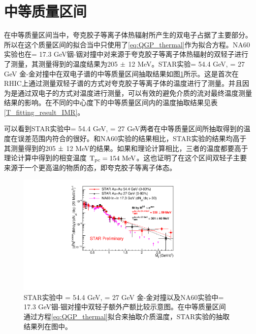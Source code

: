 \section{中等质量区间}

在中等质量区间当中，夸克胶子等离子体热辐射所产生的双电子占据了主要部分。所以在这个质量区间的拟合当中只使用了\ref{eq:QGP_thermal}作为拟合方程。NA60实验也在\sNN = 17.3 GeV铟-铟对撞中对来源于夸克胶子等离子体热辐射的双轻子进行了测量，其测量得到的温度结果为205 $\rm{ \pm }$ 12 MeV\cite{Specht:2010xu}。STAR实验\sNN = 54.4 GeV, \sNN = 27 GeV 金-金对撞中在双电子谱的中等质量区间抽取结果如图\ref{fig:Hm_ExY_FMR_54GeV_27GeV_NA60_QGPfit_icent0}所示。这是首次在RHIC上通过测量双轻子谱的方式对夸克胶子等离子体的温度进行了测量。并且因为是通过双电子的方式对温度进行测量，可以有效的避免介质的流对最终温度测量结果的影响。在不同的中心度下的中等质量区间内的温度抽取结果见表\ref{T_fitting_result_IMR}。

可以看到STAR实验中\sNN = 54.4 GeV, \sNN = 27 GeV两者在中等质量区间所抽取得到的温度在误差范围内符合的很好。和NA60实验的结果相比，STAR实验的结果均高于其测量得到的205 $\rm{ \pm }$ 12 MeV的结果。如果和理论计算相比，三者的温度都要高于理论计算中得到的相变温度 $\rm{T_{pc} =154~ MeV}$\cite{HotQCD:2018pds}。这也证明了在这个区间双轻子主要来源于一个更高温的物质的态，即夸克胶子等离子体态。

\begin{figure}[htb]
    \begin{center}
    \includegraphics[width=0.75\textwidth,clip]{figures/Chapter4/Hm_ExY_FMR_54GeV_27GeV_NA60_QGPfit_icent0.pdf}
    \end{center}
    \caption[STAR实验中 \sNN = 54.4 GeV, \sNN = 27 GeV 金-金对撞以及NA60实验中\sNN = 17.3 GeV铟-铟对撞中双轻子额外产额比较示意图]{STAR实验中 \sNN = 54.4 GeV, \sNN = 27 GeV 金-金对撞以及NA60实验中\sNN = 17.3 GeV铟-铟对撞中双轻子额外产额比较示意图。在中等质量区间通过方程\ref{eq:QGP_thermal}拟合来抽取介质温度，STAR实验的抽取结果列在图中。}
    \label{fig:Hm_ExY_FMR_54GeV_27GeV_NA60_QGPfit_icent0}
\end{figure}

